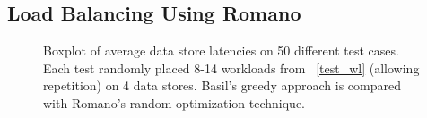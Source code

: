 \subsection{Load Balancing Using Romano}
\begin{figure}[!t]
\centering
{}
\caption{Boxplot of average data store latencies on 50 different test cases.
Each test randomly placed 8-14 workloads from \tablename~\ref{test_wl} (allowing repetition) on 4 data stores.
Basil's greedy approach is compared with Romano's random optimization technique.
}
\label{load_bal}
\end{figure}

